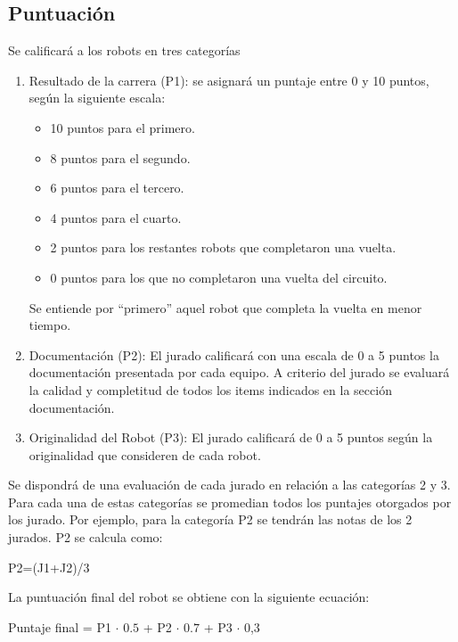 \documentclass[a4paper,11pt]{article}
\begin{document}
\subsection*{Puntuación}
Se calificará a los robots en tres categorías
\begin{enumerate}
  \item Resultado de la carrera (P1): se asignará un puntaje entre 0 y 10 puntos, según la siguiente escala:
  \begin{itemize}
    \item 10 puntos para el primero.
    \item  8 puntos para el segundo.
    \item  6 puntos para el tercero.
    \item  4 puntos para el cuarto.
    \item  2 puntos para los restantes robots que completaron una vuelta.
    \item  0 puntos para los que no completaron una vuelta del circuito.
  \end{itemize}    
    Se entiende por ``primero'' aquel robot que completa la vuelta en menor tiempo.

  \item Documentación (P2): El jurado calificará con una escala de 0 a 5 puntos la documentación presentada por cada equipo.
  A criterio del jurado se evaluará la calidad y completitud de todos los items indicados en la sección documentación.

  \item Originalidad del Robot (P3): El jurado calificará de 0 a 5 puntos según la originalidad que consideren de cada robot.
\end{enumerate}

Se dispondrá de una evaluación de cada jurado en relación a las categorías 2 y 3. Para cada una de estas categorías se promedian todos los puntajes otorgados por los jurado. Por ejemplo, para la categoría P2 se tendrán las notas de los 2 jurados. P2 se calcula como:

\begin{center}
P2=(J1+J2)/3
\end{center}

La puntuación final del robot se obtiene con la siguiente ecuación:

\begin{center}
Puntaje final = P1 $\cdot$ $0.5$ + P2 $\cdot$ $0.7$ + P3 $\cdot$ 0,3
\end{center}
\end{document}
